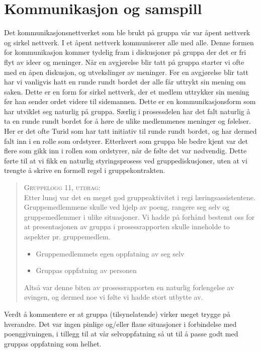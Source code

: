 \section{Kommunikasjon og samspill}
Det kommunikasjonsnettverket som ble brukt på gruppa vår var åpent nettverk og sirkel nettverk. 
I et åpent nettverk kommuniserer alle med alle. Denne formen for kommunikasjon kommer tydelig fram 
i diskusjoner på gruppa der det er fri flyt av ideer og meninger. Når en avgjørelse blir tatt på 
gruppa starter vi ofte med en åpen diskusjon, og utvekslinger av meninger. Før en avgjørelse blir 
tatt har vi vanligvis hatt en runde rundt bordet der alle får uttrykt sin mening om saken. Dette er 
en form for sirkel nettverk, der et medlem uttrykker sin mening før han sender ordet videre til sidemannen.
 Dette er en kommunikasjonsform som har utviklet seg naturlig på gruppa. Særlig i prosessdelen har 
 det falt naturlig å ta en runde rundt bordet for å høre de ulike medlemmenes meninger og følelser. 
 Her er det ofte Turid som har tatt initiativ til runde rundt bordet, og har dermed falt inn i en 
 rolle som ordstyrer. Etterhvert som gruppa ble bedre kjent var det flere som gikk inn i rollen 
 som ordstyrer, når de følte det var nødvendig. Dette førte til at vi fikk en naturlig styringsprosess
  ved gruppediskusjoner, uten at vi trengte å skrive en formell regel i
  gruppekontrakten.\\

\begin{quote}
\hspace{20pt}\textsc{Gruppelogg 11, utdrag:}\\

Etter lunsj var det en meget god gruppeaktivitet i regi læringsassistentene.
Gruppemedlemmene skulle ved hjelp av poeng, rangere seg selv og gruppemedlemmer
i ulike situasjoner. Vi hadde på forhånd bestemt oss for at presentasjonen av
gruppa i prosessrapporten skulle inneholde to aspekter pr. gruppemedlem.
\begin{itemize}
\item Gruppemedlemmets egen oppfatning av seg selv
\item Gruppas oppfatning av personen
\end{itemize}
Altså var denne biten av prosessrapporten en naturlig forlengelse av øvingen, og
dermed noe vi følte vi hadde stort utbytte av.
\end{quote}

Verdt å kommentere er at gruppa (tilsynelatende) virker meget trygge på hverandre.
Det var ingen pinlige og/eller flaue situasjoner i forbindelse med
poenggivningen, i tillegg til at vår selvoppfatning så ut til å passe godt med
gruppas oppfatning som helhet.\\

